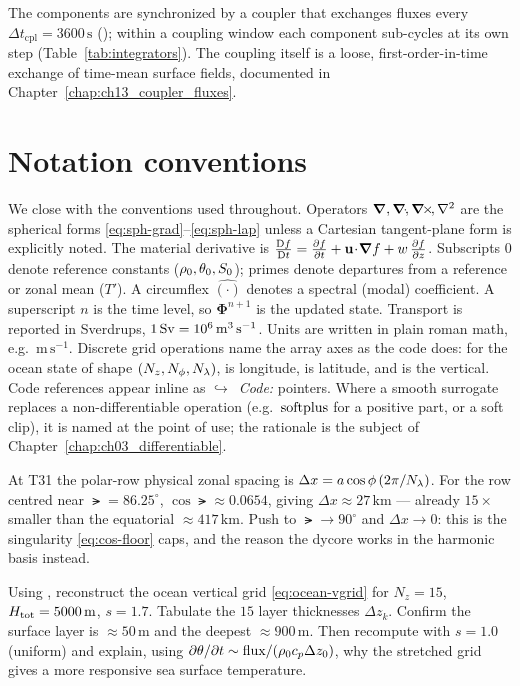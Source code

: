 The components are synchronized by a coupler that exchanges fluxes every
$\Delta t_{\mathrm{cpl}}=3600\,\mathrm{s}$ (); within a coupling window
each component sub-cycles at its own step (Table~\ref{tab:integrators}). The coupling itself is a
loose, first-order-in-time exchange of time-mean surface fields, documented in
Chapter~\ref{chap:ch13_coupler_fluxes}.

\section{Notation conventions}

We close with the conventions used throughout. Operators $\boldsymbol{\nabla},\boldsymbol{\nabla}\!\cdot\!,\boldsymbol{\nabla}\!\times\!,\nabla^{2}$ are the
spherical forms \eqref{eq:sph-grad}--\eqref{eq:sph-lap} unless a Cartesian tangent-plane form is
explicitly noted. The material derivative is
$\frac{\mathrm{D}f}{\mathrm{D}t}=\frac{\partial f}{\partial t}+\mathbf{u}\!\cdot\!\boldsymbol{\nabla} f + w\,\frac{\partial f}{\partial z}$. Subscripts $0$ denote reference
constants ($\rho_0,\theta_0,S_0$); primes denote departures from a reference or zonal mean
($T'$). A circumflex $\widehat{(\cdot)}$ denotes a spectral (modal) coefficient. A superscript $n$
is the time level, so $\boldsymbol\Phi^{n+1}$ is the updated state. Transport is reported in
Sverdrups, $1\,\mathrm{Sv}=10^{6}\,\mathrm{m^3\,s^{-1}}$. Units are written in plain roman math, e.g.\
$\mathrm{m\,s^{-1}}$. Discrete grid operations name the array axes as the code does: for the ocean
state of shape $(N_z,N_\phi,N_\lambda)$, \code{axis=2} is longitude, \code{axis=1} is latitude, and
\code{axis=0} is the vertical. Code references appear inline as
$\hookrightarrow$~\textit{Code:} pointers. Where a smooth surrogate replaces a non-differentiable
operation (e.g.\ $\operatorname{softplus}$ for a positive part, or a soft clip), it is named at the point of use;
the rationale is the subject of Chapter~\ref{chap:ch03_differentiable}.

\begin{example}
At T31 the polar-row physical zonal spacing is $\Delta x = a\cos\phi\,(2\pi/N_\lambda)$. For the
row centred near $\lat=86.25^\circ$, $\cos\lat\approx 0.0654$, giving $\Delta x\approx 27\,
\mathrm{km}$ --- already $15\times$ smaller than the equatorial $\approx 417\,\mathrm{km}$. Push to
$\lat\to90^\circ$ and $\Delta x\to0$: this is the singularity \eqref{eq:cos-floor} caps, and the
reason the \dino{} dycore works in the harmonic basis instead.
\end{example}

\begin{exercise}
Using , reconstruct the ocean vertical grid \eqref{eq:ocean-vgrid} for $N_z=15$,
$H_{\mathrm{tot}}=5000\,\mathrm{m}$, $s=1.7$. Tabulate the $15$ layer thicknesses $\Delta z_k$.
Confirm the surface layer is $\approx 50\,\mathrm{m}$ and the deepest $\approx 900\,\mathrm{m}$.
Then recompute with $s=1.0$ (uniform) and explain, using
$\partial\theta/\partial t\sim\text{flux}/(\rho_0 c_p\Delta z_0)$, why the stretched grid gives a
more responsive sea surface temperature.
\end{exercise}

